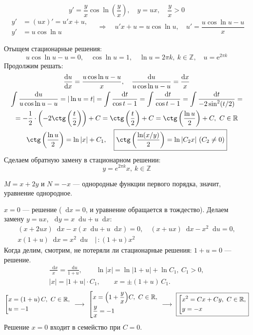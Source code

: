 \documentclass[12pt,a4paper]{article}
\numberwithin{equation}{section}
\newcommand{\R}{\mathbb{R}}
\newcommand{\Z}{\mathbb{Z}}
\newcommand{\e}{\mathrm{e}}
\newcommand{\dd}{\mathop{}\!\mathrm{d}}
\begin{document}
\begin{exampleHSE}[\(y'=\dfrac{y}{x}\cos\ln\left(\dfrac{y}{x}\right)\)]
\[y'=\frac{y}{x}\cos\ln\left(\frac{y}{x}\right),\quad y=ux,\quad\frac{y}{x}>0\]
\[
\begin{aligned}
y'&=(ux)'=u'x+u,\\
y'&=u\cos\ln u
\end{aligned}\quad\Longrightarrow\quad u'x+u=u\cos\ln u,\quad u'=\frac{u\cos\ln u-u}{x}\]

Отыщем стационарные решения:
\[u\cos\ln u-u=0,\quad\cos\ln u=1,\quad \ln u=2\pi k,\ k\in\Z,\quad u=\e^{2\pi k}\]
Продолжим решать:
\begin{gather*}
\frac{\dd u}{\dd x}=\frac{u\cos\ln u-u}{x},\quad\frac{\dd u}{u\cos\ln u-u}=\frac{\dd x}{x}\\
\int\frac{\dd u}{u\cos\ln u-u}=|\ln u=t|=\int\frac{\dd t}{\cos t-1}=\int\frac{\dd t}{\cos t-1}=\int\frac{\dd t}{-2\sin^2(t/2)}=\\=-\frac{1}{2}\cdot\left(-2\ctg\left(\frac{t}{2}\right)\right)+C=\ctg\left(\frac{t}{2}\right)+C=\ctg\left(\frac{\ln u}{2}\right)+C,\ C\in\R\\
\ctg\left(\frac{\ln u}{2}\right)=\ln|x|+C_1,\quad\boxed{\ctg\left(\frac{\ln (x/y)}{2}\right)=\ln|C_2x|\ (C_2\neq0)}
\end{gather*}
Сделаем обратную замену в стационарном решении:
\[\boxed{y=e^{2\pi k}x,\ k\in\Z}\]
\end{exampleHSE}

\begin{exampleHSE}[\((x+2y)\dd x-x\dd y=0\)]
$M=x+2y$ и $N=-x$ --- однородные функции первого порядка, значит, уравнение однородное.

$x=0$ --- решение ($\dd x=0$, и уравнение обращается в тождество). Делаем замену $y=ux$, $\dd y=x\dd u+u\dd x$:
\begin{gather*}
(x+2ux)\dd x-x(x\dd u+u\dd x)=0,\quad (x+ux)\dd x-x^2\dd u=0,\\
x(1+u)\dd x=x^2\dd u\quad\bigl|\,:(1+u)x^2
\end{gather*}
Когда делим, смотрим, не потеряли ли стационарные решения: $1+u=0$ --- решение.
\begin{gather*}
\frac{\dd x}{x}=\frac{\dd u}{1+u},\qquad
\ln|x|=\ln|1+u|+\ln C_1,\ C_1>0,\\
|x|=|1+u|\cdot C_1,\qquad x=\pm(1+u)\,C_1.
\end{gather*}
\[
\left[\begin{aligned}
&x=(1+u)\,C,\ C\in\R,\\
&u=-1
\end{aligned}\right.
\ \longrightarrow\
\left[\begin{aligned}
&x=\Bigl(1+\frac yx\Bigr)C,\ C\in\R,\\
&\frac yx=-1
\end{aligned}\right.
\ \longrightarrow\
\boxed{\left[\begin{aligned}
&x^2=Cx+Cy,\ C\in\R,\\
&y=-x
\end{aligned}\right.}
\]
Решение $x=0$ входит в семейство при $C=0$.
\end{exampleHSE}
\end{document}
